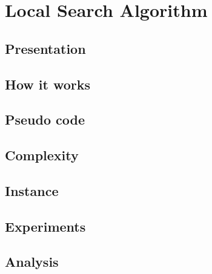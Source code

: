 
\section{Local Search Algorithm}


    \subsection{Presentation}


\subsection{How it works}


\subsection{Pseudo code}


\subsection{Complexity}


\subsection{Instance}


\subsection{Experiments}


\subsection{Analysis}

\newpage